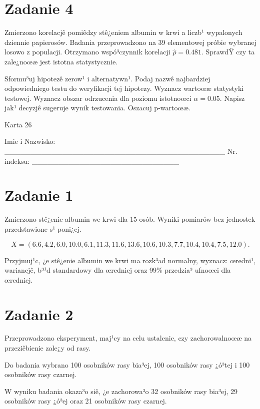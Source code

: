 \documentclass[a4paper,12pt]{article}
\begin{document}
  \section*{Zadanie 4}
     
     Zmierzono korelacjê pomiêdzy stê¿eniem albumin w krwi a liczb¹ wypalonych dziennie papierosów. 
     Badania przeprowadzono na 39 elementowej próbie wybranej losowo z populacji. 
     Otrzymano wspó³czynnik korelacji $\hat\rho = 0.481 $. 
     SprawdŸ czy ta zale¿noœæ jest istotna statystycznie. 
     
     Sformu³uj hipotezê zerow¹ i alternatywn¹. 
     Podaj nazwê najbardziej odpowiedniego testu do weryfikacji tej hipotezy. 
     Wyznacz wartoœæ statystyki testowej. 
     Wyznacz obszar odrzucenia dla poziomu istotnoœci $\alpha=0.05$. 
     Napisz jak¹ decyzjê sugeruje wynik testowania. 
     Oszacuj p-wartoœæ. \vspace{1cm} 

  \clearpage  Karta  26  

 Imie i Nazwisko: \_\_\_\_\_\_\_\_\_\_\_\_\_\_\_\_\_\_\_\_\_\_\_\_\_\_\_\_\_\_\_\_\_\_\_\_\_\_\_\_\_\_ Nr. indeksu: \_\_\_\_\_\_\_\_\_\_\_\_\_\_\_\_\_\_\_\_\_\_\_\_\_\_\_\_ 
 \section*{Zadanie 1}
     
     Zmierzono stê¿enie albumin we krwi dla 15 osób. 
     Wyniki pomiarów bez jednostek przedstawione s¹ poni¿ej. 
     
     \noindent $$X=(  6.6,  4.2,  6.0, 10.0,  6.1, 11.3, 11.6, 13.6, 10.6, 10.3,  7.7, 10.4, 10.4,  7.5, 12.0 ).$$
     
     Przyjmuj¹c, ¿e stê¿enie albumin we krwi ma rozk³ad normalny, 
     wyznacz: œredni¹, wariancjê, b³¹d standardowy dla œredniej oraz 99\% przedzia³ ufnoœci dla œredniej. \vspace{1cm} 

  \section*{Zadanie 2}
     
  Przeprowadzono eksperyment, maj¹cy na celu ustalenie, czy zachorowalnoœæ na przeziêbienie zale¿y od rasy.
  
  Do badania wybrano 100 osobników rasy bia³ej, 100 osobników rasy ¿ó³tej i 100 osobników rasy czarnej. 
  
  W wyniku badania okaza³o siê, ¿e zachorowa³o 32 osobników rasy bia³ej, 29 osobników rasy ¿ó³ej oraz 21 osobników rasy czarnej. 
  
\end{document}
